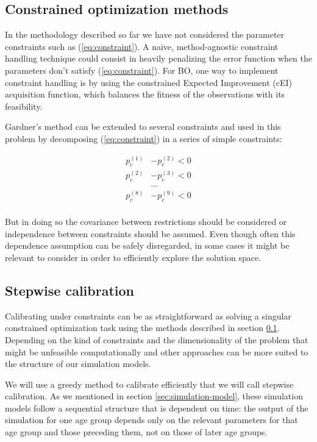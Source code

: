 \documentclass{IOS-Book-Article}
\begin{document}
	\subsection{Constrained optimization methods}
	\label{sec:constrained-optimization}
	 In the methodology described so far we have not considered the parameter constraints such as (\ref{eq:constraint}). A naive, method-agnostic constraint handling technique could consist in heavily penalizing the error function when the parameters don't satisfy (\ref{eq:constraint}). For BO, one way to implement constraint handling is by using the constrained Expected Improvement (cEI) acquisition function\cite{bo-constraints1}, which balances the fitness of the observations with its feasibility.
	
	Gardner's method can be extended to several constraints and used in this problem by decomposing (\ref{eq:constraint}) in a series of simple constraints:
		
	\begin{equation} \label{eq:constraint-simple}
		\begin{aligned}
			p_c^{(1)} &- p_c^{(2)} < 0 \\
			p_c^{(2)} &- p_c^{(3)} < 0 \\
			&\dots \\
			p_c^{(8)} &- p_c^{(9)} < 0 \\
		\end{aligned}
	\end{equation}

 But in doing so the covariance between restrictions should be considered or independence between constraints should be assumed. Even though often this dependence assumption can be safely disregarded\cite{bo-constraint-dependence}, in some cases it might be relevant to consider in order to efficiently explore the solution space. 	
 	
 	
 	\subsection{Stepwise calibration}
 	Calibrating under constraints can be as straightforward as solving a singular constrained optimization task using the methods described in section \ref{sec:constrained-optimization}. Depending on the kind of constraints and the dimensionality of the problem that might be unfeasible computationally and other approaches can be more suited to the structure of our simulation models.
 	
 	We will use a greedy method to calibrate efficiently that we will call stepwise calibration. As we mentioned in section \ref{sec:simulation-model}, these simulation models follow a sequential structure that is dependent on time: the output of the simulation for one age group depends only on the relevant parameters for that age group and those preceding them, not on those of later age groups.
 	
\end{document}
